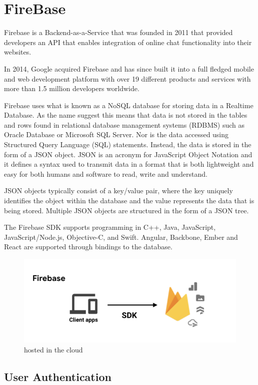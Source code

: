 \section{FireBase}
Firebase is a Backend-as-a-Service that was founded in 2011 that provided developers an API that enables integration of online chat functionality into their websites. 

In 2014, Google acquired Firebase and has since built it into a full fledged mobile and web development platform with over 19 different products and services with more than 1.5 million developers worldwide.

Firebase uses what is known as a NoSQL database for storing data in a Realtime Database. As the name suggest this means that data is not stored in the tables and rows found in relational database management systems (RDBMS) such as Oracle Database or Microsoft SQL Server. Nor is the data accessed using Structured Query Language (SQL) statements. Instead, the data is stored in the form of a JSON object. JSON is an acronym for JavaScript Object Notation and it defines a syntax used to transmit data in a format that is both lightweight and easy for both humans and software to read, write and understand.

JSON objects typically consist of a key/value pair, where the key uniquely identifies the object within the database and the value represents the data that is being stored. Multiple JSON objects are structured in the form of a JSON tree.

The Firebase SDK supports programming in C++, Java, JavaScript, JavaScript/Node.js, Objective-C, and Swift. Angular, Backbone, Ember and React are supported through bindings to the database.

\begin{figure}
    \centering
    \includegraphics[scale=0.7]{img/firebase2.PNG}
    \caption{hosted in the cloud}
    \label{fig:my_label4}
\end{figure}


\subsection{User Authentication}

